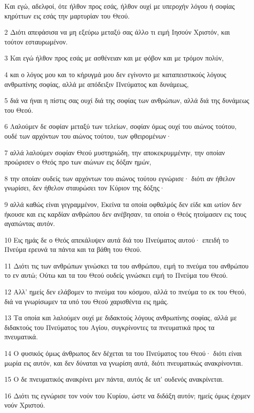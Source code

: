 \par Και εγώ, αδελφοί, ότε ήλθον προς εσάς, ήλθον ουχί με υπεροχήν λόγου ή σοφίας κηρύττων εις εσάς την μαρτυρίαν του Θεού.
\par 2 Διότι απεφάσισα να μη εξεύρω μεταξύ σας άλλο τι ειμή Ιησούν Χριστόν, και τούτον εσταυρωμένον.
\par 3 Και εγώ ήλθον προς εσάς με ασθένειαν και με φόβον και με τρόμον πολύν,
\par 4 και ο λόγος μου και το κήρυγμά μου δεν εγίνοντο με καταπειστικούς λόγους ανθρωπίνης σοφίας, αλλά με απόδειξιν Πνεύματος και δυνάμεως,
\par 5 διά να ήναι η πίστις σας ουχί διά της σοφίας των ανθρώπων, αλλά διά της δυνάμεως του Θεού.
\par 6 Λαλούμεν δε σοφίαν μεταξύ των τελείων, σοφίαν όμως ουχί του αιώνος τούτου, ουδέ των αρχόντων του αιώνος τούτου, των φθειρομένων·
\par 7 αλλά λαλούμεν σοφίαν Θεού μυστηριώδη, την αποκεκρυμμένην, την οποίαν προώρισεν ο Θεός προ των αιώνων εις δόξαν ημών,
\par 8 την οποίαν ουδείς των αρχόντων του αιώνος τούτου εγνώρισε· διότι αν ήθελον γνωρίσει, δεν ήθελον σταυρώσει τον Κύριον της δόξης·
\par 9 αλλά καθώς είναι γεγραμμένον, Εκείνα τα οποία οφθαλμός δεν είδε και ωτίον δεν ήκουσε και εις καρδίαν ανθρώπου δεν ανέβησαν, τα οποία ο Θεός ητοίμασεν εις τους αγαπώντας αυτόν.
\par 10 Εις ημάς δε ο Θεός απεκάλυψεν αυτά διά του Πνεύματος αυτού· επειδή το Πνεύμα ερευνά τα πάντα και τα βάθη του Θεού.
\par 11 Διότι τις των ανθρώπων γινώσκει τα του ανθρώπου, ειμή το πνεύμα του ανθρώπου το εν αυτώ; Ούτω και τα του Θεού ουδείς γινώσκει ειμή το Πνεύμα του Θεού.
\par 12 Αλλ' ημείς δεν ελάβομεν το πνεύμα του κόσμου, αλλά το πνεύμα το εκ του Θεού, διά να γνωρίσωμεν τα υπό του Θεού χαρισθέντα εις ημάς.
\par 13 Τα οποία και λαλούμεν ουχί με διδακτούς λόγους ανθρωπίνης σοφίας, αλλά με διδακτούς του Πνεύματος του Αγίου, συγκρίνοντες τα πνευματικά προς τα πνευματικά.
\par 14 Ο φυσικός όμως άνθρωπος δεν δέχεται τα του Πνεύματος του Θεού· διότι είναι μωρία εις αυτόν, και δεν δύναται να γνωρίση αυτά, διότι πνευματικώς ανακρίνονται.
\par 15 Ο δε πνευματικός ανακρίνει μεν πάντα, αυτός δε υπ' ουδενός ανακρίνεται.
\par 16 Διότι τις εγνώρισε τον νούν του Κυρίου, ώστε να διδάξη αυτόν; ημείς όμως έχομεν νούν Χριστού.

